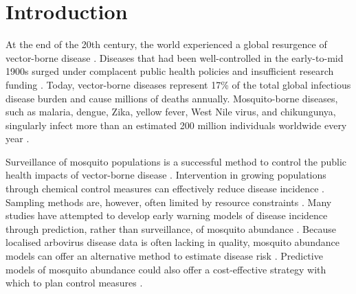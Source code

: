 \section{Introduction}
\setcounter{page}{1}


At the end of the 20th century, the world experienced a global resurgence of vector-borne disease \citep{Gubler}. Diseases that had been well-controlled in the early-to-mid 1900s surged under complacent public health policies and insufficient research funding \citep{Gubler1998}. %
Today, vector-borne diseases represent 17\% of the total global infectious disease burden and cause millions of deaths annually. Mosquito-borne diseases, such as malaria, dengue, Zika, yellow fever, West Nile virus, and chikungunya, singularly infect more than an estimated 200 million individuals worldwide every year \citep{WHOreport}. 

Surveillance of mosquito populations is a successful method to control the public health impacts of vector-borne disease \citep{Vazquez-Prokopec2010}. Intervention in growing populations through chemical control measures can effectively reduce disease incidence \citep{Tomerini2011}. Sampling methods are, however, often limited by resource constraints \citep{Sedda2019}. Many studies have attempted to develop early warning models of disease incidence through prediction, rather than surveillance, of mosquito abundance \citep{Beck-Johnson2013, Li2019, Poh2019}. Because localised arbovirus disease data is often lacking in quality, mosquito abundance models can offer an alternative method to estimate disease risk \citep{Lowe2013}. Predictive models of mosquito abundance could also offer a cost-effective strategy with which to plan control measures \citep{Yang2009}.  

